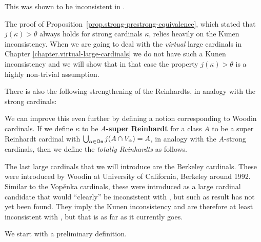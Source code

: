 \documentclass[../../main]{subfiles}
\begin{document}
This was shown to be inconsistent in \cite{kunen-inconsistency}.


The proof of Proposition~\ref{prop.strong-prestrong-equivalence}, which stated that $j(\kappa)>\theta$ always holds for strong cardinals $\kappa$, relies heavily on the Kunen inconsistency. When we are going to deal with the \textit{virtual} large cardinals in Chapter \ref{chapter.virtual-large-cardinals} we do not have such a Kunen inconsistency and we will show that in that case the property $j(\kappa)>\theta$ is a highly non-trivial assumption.

\qquad There is also the following strengthening of the Reinhardts, in analogy with the strong cardinals:


We can improve this even further by defining a notion corresponding to Woodin cardinals. If we define $\kappa$ to be \textbf{$A$-super Reinhardt} for a class $A$ to be a super Reinhardt cardinal with $\bigcup_{\alpha\in\textsf{On}}j(A\cap V_\alpha)=A$, in analogy with the $A$-strong cardinals, then we define the \textit{totally Reinhardts} as follows.


The last large cardinals that we will introduce are the Berkeley cardinals. These were introduced by Woodin at University of California, Berkeley around 1992. Similar to the Vop\v enka cardinals, these were introduced as a large cardinal candidate that would ``clearly'' be inconsistent with \zf, but such as result has not yet been found. They imply the Kunen inconsistency and are therefore at least inconsistent with \zfc, but that is as far as it currently goes.

\qquad We start with a preliminary definition.

\end{document}
